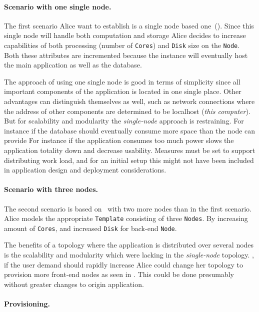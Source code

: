 \paragraph{Scenario with one single node.}

The first scenario Alice want to establish is a single node based one~().
Since this single node will handle both computation and storage Alice decides to 
increase capabilities of both processing (number of \texttt{Cores}) and 
\texttt{Disk} size on the \texttt{Node}.
Both these attributes are incremented because the instance will eventually host the main
application as well as the database.

The approach of using one single node is good in terms of simplicity since all important
components of the application is located in one single place.
Other advantages can distinguish themselves as well, such as network connections where
the address of other components are determined to be localhost (\emph{this computer}).
But for scalability and modularity the \emph{single-node} approach is restraining.
For instance if the database should eventually consume more space than the node can provide
For instance if the application consumes too much  power slows the application
totality down and decrease usability.
Measures must be set to support distributing work load, and for an initial setup this might not have been
included in application design and deployment considerations.

\paragraph{Scenario with three nodes.}

The second scenario is based on~ with two more nodes than in the first scenario.
Alice models the appropriate \texttt{Template} consisting
of three \texttt{Nodes}.
By increasing amount of \texttt{Cores}, and increased \texttt{Disk} for back-end \texttt{Node}.

The benefits of a topology where the application is distributed over several nodes 
is the scalability and modularity which were lacking in the \emph{single-node} topology.
\eg, if the user demand should rapidly increase Alice could change her topology to
provision more front-end nodes as seen in .
This could be done presumably without greater changes to origin application.

\paragraph{Provisioning.}

